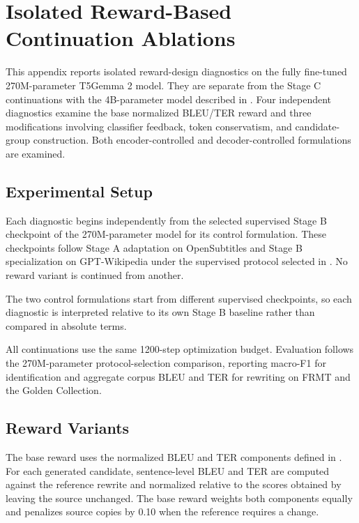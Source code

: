 \chapter[Isolated Reward-Based Continuation Ablations]{Isolated Reward-Based\\Continuation Ablations}
\label{chap:appendix-rl-ablation}

This appendix reports isolated reward-design diagnostics on the fully fine-tuned
270M-parameter T5Gemma 2 model. They are separate from the Stage C
continuations with the 4B-parameter model described in
. Four independent diagnostics examine
the base normalized BLEU/TER reward and three modifications involving classifier
feedback, token conservatism, and candidate-group construction. Both
encoder-controlled and decoder-controlled formulations are examined.

\section{Experimental Setup}

Each diagnostic begins independently from the selected supervised Stage B
checkpoint of the 270M-parameter model for its control formulation. These
checkpoints follow Stage A adaptation on OpenSubtitles and Stage B
specialization on GPT-Wikipedia under the supervised protocol selected in
. No reward variant is continued from
another.

The two control formulations start from different supervised checkpoints, so
each diagnostic is interpreted relative to its own Stage B baseline rather than
compared in absolute terms.

All continuations use the same 1200-step optimization budget. Evaluation follows
the 270M-parameter protocol-selection comparison, reporting macro-F1 for
identification and aggregate corpus BLEU and TER for rewriting on FRMT and the
Golden Collection.

\section{Reward Variants}

The base reward uses the normalized BLEU and TER components defined in
. For each generated candidate, sentence-level BLEU
and TER are computed against the reference rewrite and normalized relative to
the scores obtained by leaving the source unchanged. The base reward weights both components equally and penalizes source copies by 0.10 when the reference requires a change.

